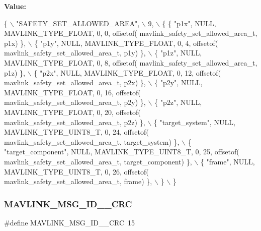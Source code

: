 {\bfseries Value\+:}
\begin{DoxyCode}
\{ \(\backslash\)
    \textcolor{stringliteral}{"SAFETY\_SET\_ALLOWED\_AREA"}, \(\backslash\)
    9, \(\backslash\)
    \{  \{ \textcolor{stringliteral}{"p1x"}, NULL, MAVLINK_TYPE_FLOAT, 0, 0, offsetof(
      mavlink_safety_set_allowed_area_t, p1x) \}, \(\backslash\)
         \{ \textcolor{stringliteral}{"p1y"}, NULL, MAVLINK_TYPE_FLOAT, 0, 4, offsetof(
      mavlink_safety_set_allowed_area_t, p1y) \}, \(\backslash\)
         \{ \textcolor{stringliteral}{"p1z"}, NULL, MAVLINK_TYPE_FLOAT, 0, 8, offsetof(
      mavlink_safety_set_allowed_area_t, p1z) \}, \(\backslash\)
         \{ \textcolor{stringliteral}{"p2x"}, NULL, MAVLINK_TYPE_FLOAT, 0, 12, offsetof(
      mavlink_safety_set_allowed_area_t, p2x) \}, \(\backslash\)
         \{ \textcolor{stringliteral}{"p2y"}, NULL, MAVLINK_TYPE_FLOAT, 0, 16, offsetof(
      mavlink_safety_set_allowed_area_t, p2y) \}, \(\backslash\)
         \{ \textcolor{stringliteral}{"p2z"}, NULL, MAVLINK_TYPE_FLOAT, 0, 20, offsetof(
      mavlink_safety_set_allowed_area_t, p2z) \}, \(\backslash\)
         \{ \textcolor{stringliteral}{"target\_system"}, NULL, MAVLINK_TYPE_UINT8_T, 0, 24, offsetof(
      mavlink_safety_set_allowed_area_t, target\_system) \}, \(\backslash\)
         \{ \textcolor{stringliteral}{"target\_component"}, NULL, MAVLINK_TYPE_UINT8_T, 0, 25, offsetof(
      mavlink_safety_set_allowed_area_t, target\_component) \}, \(\backslash\)
         \{ \textcolor{stringliteral}{"frame"}, NULL, MAVLINK_TYPE_UINT8_T, 0, 26, offsetof(
      mavlink_safety_set_allowed_area_t, frame) \}, \(\backslash\)
         \} \(\backslash\)
\}
\end{DoxyCode}
\mbox{\label{mavlink__msg__safety__set__allowed__area_8h_a51fd19f0a72fa75d2339636f79015c10}} 
\subsubsection{M\+A\+V\+L\+I\+N\+K\+\_\+\+M\+S\+G\+\_\+\+I\+D\+\_\+\_\+\+C\+RC}
{\footnotesize\ttfamily \#define M\+A\+V\+L\+I\+N\+K\+\_\+\+M\+S\+G\+\_\+\+I\+D\+\_\+\_\+\+C\+RC~15}

